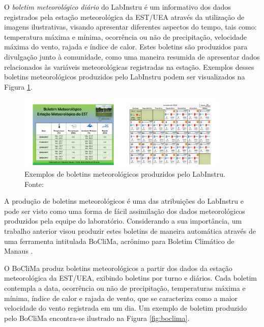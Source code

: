 O \emph{boletim meteorológico diário} do LabInstru é um informativo dos dados registrados pela estação meteorológica da EST/UEA através da utilização de imagens ilustrativas, visando apresentar diferentes aspectos do tempo, tais como: temperatura máxima e mínima, ocorrência ou não de precipitação, velocidade máxima do vento, rajada e índice de calor. Estes boletins são produzidos para divulgação junto à comunidade, como uma maneira resumida de apresentar dados relacionados às variáveis meteorológicas registradas na estação. Exemplos desses boletins meteorológicos produzidos pelo LabInstru podem ser visualizados na Figura \ref{fig:bm}.

\begin{figure}[h!]
	\centering
	\includegraphics[width=0.9\textwidth]{./img/bm.png}
	\caption{Exemplos de boletins meteorológicos produzidos pelo LabInstru. Fonte: \cite{Labinstru:EST}} \label{fig:bm}
\end{figure}

A produção de boletins meteorológicos é uma das atribuições do LabInstru e pode ser visto como uma forma de fácil assimilação dos dados meteorológicos produzidos pela equipe do laboratório. Considerando a sua importância, um trabalho anterior visou produzir estes boletins de maneira automática através de uma ferramenta intitulada BoCliMa, acrônimo para Boletim Climático de Manaus \cite{Lima:Artigo}.

O BoCliMa produz boletins meteorológicos a partir dos dados da estação meteorológica da EST/UEA, exibindo boletins por turno e diários. Cada boletim contempla a data, ocorrência ou não de precipitação, temperaturas máxima e mínima, índice de calor e rajada de vento, que se caracteriza como a maior velocidade do vento registrada em um dia. Um exemplo de boletim produzido pelo BoCliMa encontra-se ilustrado na Figura \ref{fig:boclima}.

\newpage

